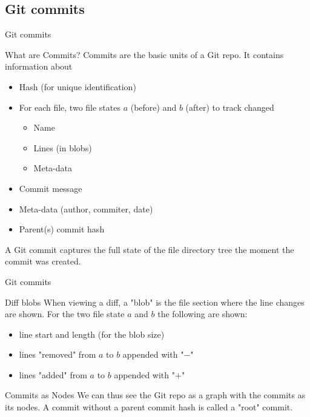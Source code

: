 \documentclass{beamer}
\begin{document}
\subsection{Git commits}

\begin{frame}{Git commits}
  \begin{block}{What are Commits?}
    Commits are the basic units of a Git repo.
    It contains information about
    \begin{itemize}
      \item Hash (for unique identification)
      \item For each file, two file states $a$ (before) and $b$ (after) to track changed
      \begin{itemize}
        \item Name
        \item Lines (in blobs)
        \item Meta-data
      \end{itemize}
      \item Commit message
      \item Meta-data (author, commiter, date)
      \item Parent(s) commit hash
    \end{itemize}
    A Git commit captures the full state of the file directory tree the moment the commit was created.
  \end{block}
\end{frame}

\begin{frame}{Git commits}
  \begin{block}{Diff blobs}
    When viewing a diff, a "blob" is the file section where the line changes are shown. For the two file state $a$ and $b$ the following are shown:
    \begin{itemize}
      \item line start and length (for the blob size)
      \item lines "removed" from $a$ to $b$ appended with "$-$"
      \item lines "added" from $a$ to $b$ appended with "$+$"
    \end{itemize}
  \end{block}
  \begin{block}{Commits as Nodes}
    We can thus see the Git repo as a graph with the commits as its nodes. A commit without a parent commit hash is called a "root" commit. 
  \end{block}
\end{frame}
\end{document}
